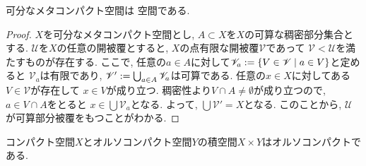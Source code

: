 \documentclass[uplatex, dvipdfmx, a4paper, 12pt, class=jsbook, crop=false]{standalone}
\begin{document}
\begin{proposition}
	可分なメタコンパクト空間は \Lindelof 空間である.
\end{proposition}

\begin{proof}
	$ X $を可分なメタコンパクト空間とし, $ A \subset X $を$ X $の可算な稠密部分集合とする. 
	$ \mathscr{U} $を$ X $の任意の開被覆とすると, $ X $の点有限な開被覆$ \mathscr{V} $であって
	$ \mathscr{V} < \mathscr{U} $を満たすものが存在する. 
	ここで, 任意の$ a \in A $に対して$ \mathscr{V}_a \defeq \setcomp{V \in \mathscr{V}}{a \in V} $と定めると
	$ \mathscr{V}_a $は有限であり, $ \mathscr{V}' \mathrel{:=} \bigcup_{a \in A} \mathscr{V}_a $は可算である. 
	任意の$ x \in X $に対してある$ V \in \mathscr{V} $が存在して
	$ x \in V $が成り立つ. 稠密性より$ V \cap A \neq \emptyset $が成り立つので, $ a \in V \cap A $をとると
	$ x \in \bigcup \mathscr{V}_a $となる. よって, $ \bigcup \mathscr{V}' = X $となる. 
	このことから, $ \mathscr{U} $が可算部分被覆をもつことがわかる.
\end{proof} 

\begin{proposition}
	\label{prop: A product space of a compact space X and orthocompact space Y is orthocompact}
	コンパクト空間$ X $とオルソコンパクト空間$ Y $の積空間$ X \times Y $はオルソコンパクトである.
\end{proposition}
\end{document}
